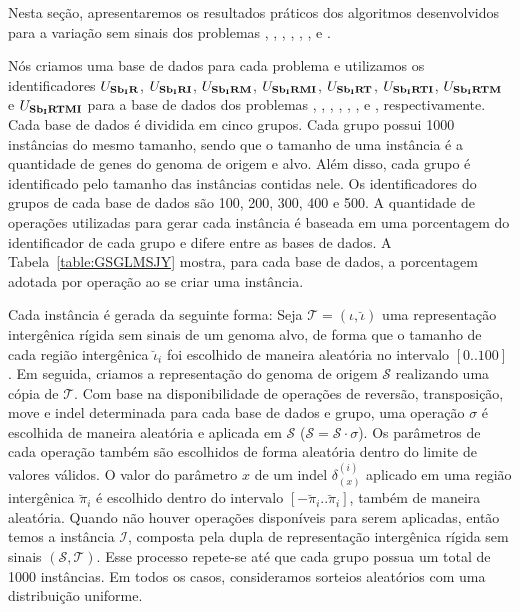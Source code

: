 Nesta seção, apresentaremos os resultados práticos dos algoritmos desenvolvidos para a variação sem sinais dos problemas \SbIR{}, \SbIRI{}, \SbIRM{}, \SbIRMI{}, \SbIRT{}, \SbIRTI{}, \SbIRTM{} e \SbIRTMI{}.

Nós criamos uma base de dados para cada problema e utilizamos os identificadores $U_{\textbf{Sb\textsubscript{I}R}}{}$, $U_{\textbf{Sb\textsubscript{I}RI}}{}$, $U_{\textbf{Sb\textsubscript{I}RM}}{}$, $U_{\textbf{Sb\textsubscript{I}RMI}}{}$, $U_{\textbf{Sb\textsubscript{I}RT}}{}$, $U_{\textbf{Sb\textsubscript{I}RTI}}{}$, $U_{\textbf{Sb\textsubscript{I}RTM}}{}$ e $U_{\textbf{Sb\textsubscript{I}RTMI}}{}$ para a base de dados dos problemas \SbIR{}, \SbIRI{}, \SbIRM{}, \SbIRMI{}, \SbIRT{}, \SbIRTI{}, \SbIRTM{} e \SbIRTMI{}, respectivamente. Cada base de dados é dividida em cinco grupos. Cada grupo possui 1000 instâncias do mesmo tamanho, sendo que o tamanho de uma instância é a quantidade de genes do genoma de origem e alvo. Além disso, cada grupo é identificado pelo tamanho das instâncias contidas nele. Os identificadores do grupos de cada base de dados são 100, 200, 300, 400 e 500. A quantidade de operações utilizadas para gerar cada instância é baseada em uma porcentagem do identificador de cada grupo e difere entre as bases de dados. A Tabela~\ref{table:GSGLMSJY} mostra, para cada base de dados, a porcentagem adotada por operação ao se criar uma instância. 



Cada instância é gerada da seguinte forma: Seja $\mathcal{T} = (\iota,\breve\iota)$ uma representação intergênica rígida sem sinais de um genoma alvo, de forma que o tamanho de cada região intergênica $\breve\iota_i$ foi escolhido de maneira aleatória no intervalo $[0..100]$. Em seguida, criamos a representação do genoma de origem $\mathcal{S}$ realizando uma cópia de $\mathcal{T}$. Com base na disponibilidade de operações de reversão, transposição, move e indel determinada para cada base de dados e grupo, uma operação $\sigma$ é escolhida de maneira aleatória e aplicada em $\mathcal{S}$ ($\mathcal{S} = \mathcal{S} \cdot \sigma$). Os parâmetros de cada operação também são escolhidos de forma aleatória dentro do limite de valores válidos. O valor do parâmetro $x$ de um indel $\delta^{(i)}_{(x)}$ aplicado em uma região intergênica $\breve\pi_{i}$ é escolhido dentro do intervalo $[-\breve\pi_{i}..\breve\pi_{i}]$, também de maneira aleatória. Quando não houver operações disponíveis para serem aplicadas, então temos a instância $\mathcal{I}$, composta pela dupla de representação intergênica rígida sem sinais $(\mathcal{S},\mathcal{T})$. Esse processo repete-se até que cada grupo possua um total de 1000 instâncias. Em todos os casos, consideramos sorteios aleatórios com uma distribuição uniforme.

